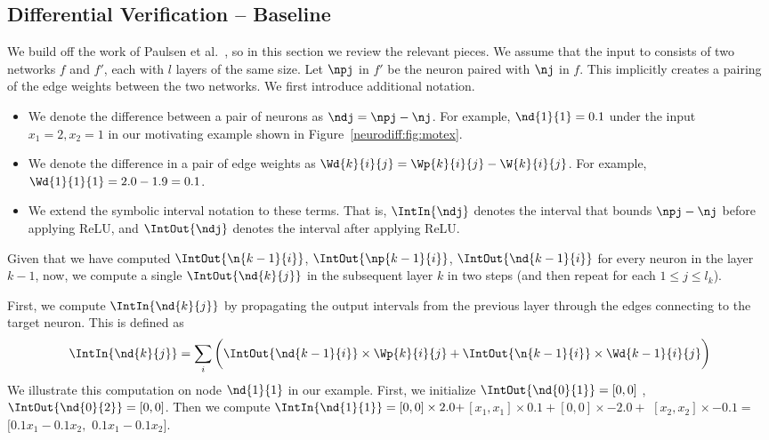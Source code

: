 \subsection{Differential Verification -- Baseline}
\label{neurodiff:sec:baseline}

We build off the work of Paulsen et al.~\cite{PaulsenWW20}, so in this section
we review the relevant pieces. We assume that the input
to \Name{} consists of two networks $ f $ and $ f' $, each with $ l $ layers
of the same size.  Let $ \npj $ in $ f' $ be the neuron paired with
$ \nj $ in $ f $. This implicitly creates a pairing of the edge
weights between the two networks. We first introduce additional notation.
%
\begin{itemize}
\item
We denote the difference between a pair of neurons as $ \ndj = \npj
- \nj $. For example, $ \nd{1}{1} = 0.1 $ under the input $ x_1 = 2, x_2 =
1 $ in our motivating example shown in Figure~\ref{neurodiff:fig:motex}.
\item
We denote the difference in a pair of edge weights as $ \Wd{k}{i}{j}
= \Wp{k}{i}{j} - \W{k}{i}{j} $. For example, $ \Wd{1}{1}{1} = 2.0 -
1.9 = 0.1 $.
\item
We extend the symbolic interval notation to these terms. That is,
$ \IntIn{\ndj} $ denotes the interval that bounds $ \npj - \nj $
before applying ReLU, and $ \IntOut{\ndj} $ denotes the interval after
applying ReLU.
\end{itemize}

Given that we have computed $ \IntOut{\n{k-1}{i}}$,
$\IntOut{\np{k-1}{i}}$, $\IntOut{\nd{k-1}{i}} $ for every neuron in
the layer $ k - 1 $, now, we compute a single $ \IntOut{\nd{k}{j}} $
in the subsequent layer $k$ in two steps (and then repeat for each $ 1 \leq
j \leq l_k $).

First, we compute $ \IntIn{\nd{k}{j}} $ by propagating the output
intervals from the previous layer through the edges connecting to the
target neuron. This is defined as
%
\[
	\IntIn{\nd{k}{j}} = \sum_{i} \bigg( \IntOut{\nd{k-1}{i}} \times \Wp{k}{i}{j} + \IntOut{\n{k-1}{i}} \times \Wd{k-1}{i}{j} \bigg)
\]
%
We illustrate this computation on node $ \nd{1}{1} $ in our
example. First, we initialize $ \IntOut{\nd{0}{1}} = [0,0]$ ,
$\IntOut{\nd{0}{2}} = [0,0]$. Then we compute $ \IntIn{\nd{1}{1}} =
[0, 0] \times 2.0 +$$ [x_1, x_1] \times 0.1 + $$ [0, 0] \times -2.0 +
$ $ [x_2, x_2] \times -0.1 = $ $[0.1x_1 - 0.1x_2,$ $ 0.1x_1 - 0.1x_2]
$.

